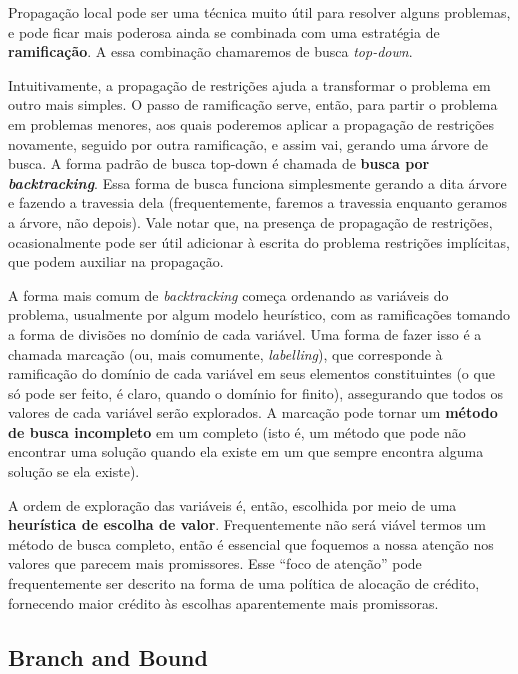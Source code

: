 \documentclass{article}
\theoremstyle{remark}
\theoremstyle{theorem}
\begin{document}
Propagação local pode ser uma técnica muito útil para resolver alguns problemas, e pode ficar mais poderosa ainda se combinada com uma estratégia de \textbf{ramificação}. A essa combinação chamaremos de busca \textit{top-down}.

Intuitivamente, a propagação de restrições ajuda a transformar o problema em outro mais simples. O passo de ramificação serve, então, para partir o problema em problemas menores, aos quais poderemos aplicar a propagação de restrições novamente, seguido por outra ramificação, e assim vai, gerando uma árvore de busca. A forma padrão de busca top-down é chamada de \textbf{busca por \textit{backtracking}}. Essa forma de busca funciona simplesmente
gerando a dita árvore e fazendo a travessia dela (frequentemente, faremos a travessia enquanto geramos a árvore, não depois). Vale notar que, na presença de propagação de restrições, ocasionalmente pode ser útil adicionar à escrita do problema restrições implícitas, que podem auxiliar na propagação.

A forma mais comum de \textit{backtracking} começa ordenando as variáveis do problema, usualmente por algum modelo heurístico, com as ramificações tomando a forma de divisões no domínio de cada variável. Uma forma de fazer isso é a chamada marcação (ou, mais comumente, \textit{labelling}), que corresponde à ramificação do domínio de cada variável em seus elementos constituintes (o que só pode ser feito, é claro, quando o domínio for finito), assegurando que todos os valores de cada variável
serão explorados. A marcação pode tornar um \textbf{método de busca incompleto}
em um completo (isto é, um método que pode não encontrar uma solução quando ela existe em um que sempre encontra alguma solução se ela existe).

A ordem de exploração das variáveis é, então, escolhida por meio de uma \textbf{heurística de escolha de valor}. Frequentemente não será viável termos um método de busca completo, então é essencial que foquemos a nossa atenção nos valores que parecem mais promissores. Esse ``foco de atenção'' pode frequentemente ser descrito na forma de uma política de alocação de crédito, fornecendo maior crédito às escolhas aparentemente mais promissoras.

\subsection{Branch and Bound}
\end{document}

